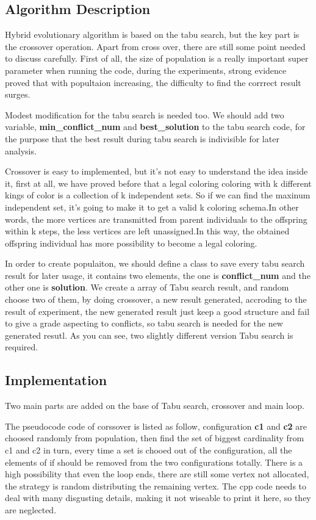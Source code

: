 \documentclass[10pt, a4paper, twocolumn]{article} %
\begin{document}
\subsection{Algorithm Description}

Hybrid evolutionary algorithm is based on the tabu search, but the key part is
the crossover operation. Apart from cross over, there are still some point
needed to discuss carefully. First of all, the size of population is a really
important super parameter when running the code, during the experiments, strong
evidence proved that with popultaion increasing, the difficulty to find the
corrrect result surges.

Modest modification for the tabu search is needed too. We should add two
variable, \textbf{min\_conflict\_num} and \textbf{best\_solution} to the tabu
search code, for the purpose that the best result during tabu search is
indivisible for later analysis.

Crossover is easy to implemented, but it's not easy to understand the idea
inside it, first at all, we have proved before that a legal coloring coloring
with k different kings of color is a collection of k independent sets. So if we
can find the maxinum independent set, it's going to make it to get a valid k
coloring schema.In other words, the more vertices are transmitted from parent
individuals to the offspring within k steps, the less vertices are
left unassigned.In this way, the obtained offspring individual has more
possibility to become a legal coloring.

In order to create populaiton, we should define a class to save every tabu
search result for later usage, it contains two elements, the one is
\textbf{conflict\_num} and the other one is \textbf{solution}. We create a array
of Tabu search result, and random choose two of them, by doing crossover, a new
result generated, accroding to the result of experiment, the new generated
result just keep a good structure and fail to give a grade aspecting to
conflicts, so tabu search is needed for the new generated resutl. As you can
see, two slightly different version Tabu search is required.

\pagebreak
\subsection{Implementation}

Two main parts are added on the base of Tabu search, crossover and main loop.

The pseudocode code of corssover is listed as follow, configuration \textbf{c1}
and \textbf{c2} are choosed randomly from population, then find the set of
biggest cardinality from c1 and c2 in turn, every time a set is chooed out of
the configuration, all the elements of if should be removed from the two
configurations totally. There is a high possibility that even the loop ends,
there are still some vertex not allocated, the strategy is random distributing
the remaining vertex. The cpp code needs to deal with many disgusting details,
making it not wiseable to print it here, so they are neglected.
\end{document}
